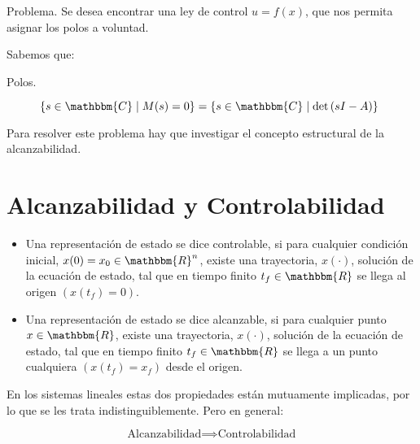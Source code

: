     Problema. Se desea encontrar una ley de control $u = f(x)$, que nos permita asignar los polos a voluntad.

    Sabemos que:

    \begin{description}
        \item [Polos.] $\left\{ s \in \mathbbm{C} \mid M(s) = 0 \right\} = \left\{ s \in \mathbbm{C} \mid \det{(sI - A)} \right\}$
    \end{description}

    Para resolver este problema hay que investigar el concepto estructural de la alcanzabilidad.


    \newpage
    \section{Alcanzabilidad y Controlabilidad}

        \begin{itemize}
            \item Una representación de estado se dice controlable, si para cualquier condición inicial, $x(0) = x_0 \in \mathbbm{R}^n$, existe una trayectoria, $x(\cdot)$, solución de la ecuación de estado, tal que en tiempo finito $t_f \in \mathbbm{R}$ se llega al origen $\left( x(t_f) = 0 \right)$.



            \item Una representación de estado se dice alcanzable, si para cualquier punto $x \in \mathbbm{R}$, existe una trayectoria, $x(\cdot)$, solución de la ecuación de estado, tal que en tiempo finito $t_f \in \mathbbm{R}$ se llega a un punto cualquiera $\left( x(t_f) = x_f \right)$ desde el origen.
        \end{itemize}

        En los sistemas lineales estas dos propiedades están mutuamente implicadas, por lo que se les trata indistinguiblemente. Pero en general:

        \begin{equation}
            \text{Alcanzabilidad} \implies \text{Controlabilidad}
        \end{equation}

